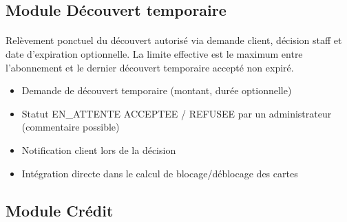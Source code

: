 \documentclass[12pt,a4paper]{report}
\begin{document}
\subsection{Module Découvert temporaire}
\paragraph{}Relèvement ponctuel du découvert autorisé via demande client, décision staff et date d'expiration optionnelle. La limite effective est le maximum entre l'abonnement et le dernier découvert temporaire accepté non expiré.
\begin{itemize}[leftmargin=1.5cm]
    \item Demande de découvert temporaire (montant, durée optionnelle)
    \item Statut EN\_ATTENTE \textrightarrow{} ACCEPTEE / REFUSEE par un administrateur (commentaire possible)
    \item Notification client lors de la décision
    \item Intégration directe dans le calcul de blocage/déblocage des cartes
\end{itemize}

\subsection{Module Crédit}
\end{document}

